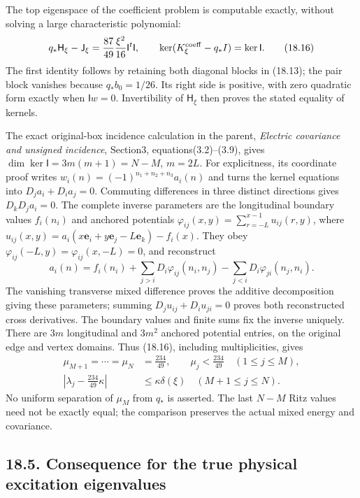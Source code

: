 \documentclass[
]{article}
\begin{document}
The top eigenspace of the coefficient problem is computable exactly,
without solving a large characteristic polynomial: \[
q_*\mathsf H_\xi-\mathsf J_\xi
 =\frac{87}{49}\frac{\xi^2}{16}\mathsf I^t\mathsf I,
\qquad
\ker(K^{\rm coeff}_\xi-q_*I)=\ker\mathsf I .                 \tag{18.16}
\] The first identity follows by retaining both diagonal blocks in
(18.13); the pair block vanishes because \(q_*b_0=1/26\). Its right side
is positive, with zero quadratic form exactly when \(\mathsf Iw=0\).
Invertibility of \(\mathsf H_\xi\) then proves the stated equality of
kernels.

The exact original-box incidence calculation in the parent,
\emph{Electric covariance and unsigned incidence}, Section3,
equations(3.2)--(3.9), gives \(\dim\ker\mathsf I=3m(m+1)=N-M\),
\(m=2L\). For explicitness, its coordinate proof writes
\(w_i(n)=(-1)^{n_1+n_2+n_3}a_i(n)\) and turns the kernel equations into
\(D_ja_i+D_ia_j=0\). Commuting differences in three distinct directions
gives \(D_kD_ja_i=0\). The complete inverse parameters are the
longitudinal boundary values \(f_i(n_i)\) and anchored potentials
\(\varphi_{ij}(x,y)=\sum_{r=-L}^{x-1}u_{ij}(r,y)\), where
\(u_{ij}(x,y)=a_i(x\mathbf e_i+y\mathbf e_j-L\mathbf e_k)-f_i(x)\). They
obey \(\varphi_{ij}(-L,y)=\varphi_{ij}(x,-L)=0\), and reconstruct \[
a_i(n)=f_i(n_i)+\sum_{j>i}D_i\varphi_{ij}(n_i,n_j)
                    -\sum_{j<i}D_i\varphi_{ji}(n_j,n_i).
\] The vanishing transverse mixed difference proves the additive
decomposition giving these parameters; summing \(D_ju_{ij}+D_iu_{ji}=0\)
proves both reconstructed cross derivatives. The boundary values and
finite sums fix the inverse uniquely. There are \(3m\) longitudinal and
\(3m^2\) anchored potential entries, on the original edge and vertex
domains. Thus (18.16), including multiplicities, gives \[
\begin{split}
\mu_{M+1}=\cdots=\mu_N&=\frac{234}{49},\qquad
\mu_j<\frac{234}{49}\quad(1\le j\le M),\\
\left|\lambda_j-\frac{234}{49}\kappa\right|
 &\le\kappa\delta(\xi)\quad(M+1\le j\le N).
\end{split}                                                   \tag{18.17}
\] No uniform separation of \(\mu_M\) from \(q_*\) is asserted. The last
\(N-M\) Ritz values need not be exactly equal; the comparison preserves
the actual mixed energy and covariance.

\subsection{18.5. Consequence for the true physical excitation
eigenvalues}\label{consequence-for-the-true-physical-excitation-eigenvalues}
\end{document}
